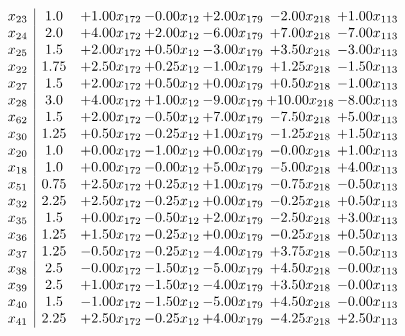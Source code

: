 \documentclass[8pt]{article}
\begin{document}
\[\begin{array}{c| c c@{\hskip 2pt} c@{\hskip 2pt} c@{\hskip 2pt} c@{\hskip 2pt} c@{\hskip 2pt} }
 x_{23}   &  1.0 & +  1.00 x_{172} & -0.00 x_{12} & +  2.00 x_{179} & -2.00 x_{218} & +  1.00 x_{113}\\
 x_{24}   &  2.0 & +  4.00 x_{172} & +  2.00 x_{12} & -6.00 x_{179} & +  7.00 x_{218} & -7.00 x_{113}\\
 x_{25}   &  1.5 & +  2.00 x_{172} & +  0.50 x_{12} & -3.00 x_{179} & +  3.50 x_{218} & -3.00 x_{113}\\
 x_{22}   &  1.75 & +  2.50 x_{172} & +  0.25 x_{12} & -1.00 x_{179} & +  1.25 x_{218} & -1.50 x_{113}\\
 x_{27}   &  1.5 & +  2.00 x_{172} & +  0.50 x_{12} & +  0.00 x_{179} & +  0.50 x_{218} & -1.00 x_{113}\\
 x_{28}   &  3.0 & +  4.00 x_{172} & +  1.00 x_{12} & -9.00 x_{179} & + 10.00 x_{218} & -8.00 x_{113}\\
 x_{62}   &  1.5 & +  2.00 x_{172} & -0.50 x_{12} & +  7.00 x_{179} & -7.50 x_{218} & +  5.00 x_{113}\\
 x_{30}   &  1.25 & +  0.50 x_{172} & -0.25 x_{12} & +  1.00 x_{179} & -1.25 x_{218} & +  1.50 x_{113}\\
 x_{20}   &  1.0 & +  0.00 x_{172} & -1.00 x_{12} & +  0.00 x_{179} & -0.00 x_{218} & +  1.00 x_{113}\\
 x_{18}   &  1.0 & +  0.00 x_{172} & -0.00 x_{12} & +  5.00 x_{179} & -5.00 x_{218} & +  4.00 x_{113}\\
 x_{51}   &  0.75 & +  2.50 x_{172} & +  0.25 x_{12} & +  1.00 x_{179} & -0.75 x_{218} & -0.50 x_{113}\\
 x_{32}   &  2.25 & +  2.50 x_{172} & -0.25 x_{12} & +  0.00 x_{179} & -0.25 x_{218} & +  0.50 x_{113}\\
 x_{35}   &  1.5 & +  0.00 x_{172} & -0.50 x_{12} & +  2.00 x_{179} & -2.50 x_{218} & +  3.00 x_{113}\\
 x_{36}   &  1.25 & +  1.50 x_{172} & -0.25 x_{12} & +  0.00 x_{179} & -0.25 x_{218} & +  0.50 x_{113}\\
 x_{37}   &  1.25 & -0.50 x_{172} & -0.25 x_{12} & -4.00 x_{179} & +  3.75 x_{218} & -0.50 x_{113}\\
 x_{38}   &  2.5 & -0.00 x_{172} & -1.50 x_{12} & -5.00 x_{179} & +  4.50 x_{218} & -0.00 x_{113}\\
 x_{39}   &  2.5 & +  1.00 x_{172} & -1.50 x_{12} & -4.00 x_{179} & +  3.50 x_{218} & -0.00 x_{113}\\
 x_{40}   &  1.5 & -1.00 x_{172} & -1.50 x_{12} & -5.00 x_{179} & +  4.50 x_{218} & -0.00 x_{113}\\
 x_{41}   &  2.25 & +  2.50 x_{172} & -0.25 x_{12} & +  4.00 x_{179} & -4.25 x_{218} & +  2.50 x_{113}\\

\end{array}\]
\end{document}
